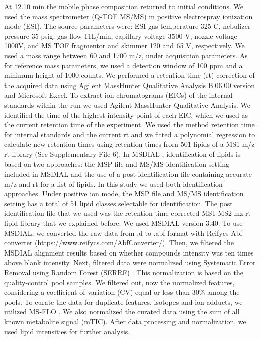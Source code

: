 \documentclass[9pt,twocolumn,twoside,lineno]{BioRxiv}
\begin{document}
At 12.10 min the mobile phase composition returned to initial conditions.
We used the mass spectrometer (Q-TOF MS/MS) in positive electrospray ionization mode (ESI).
The source parameters were: ESI gas temperature 325 \degree C, nebulizer pressure 35 psig, gas flow 11L/min, capillary voltage 3500 V, nozzle voltage 1000V, and MS TOF fragmentor and skimmer 120 and 65 V, respectively.
We used a mass range between 60 and 1700 m/z, under acquisition parameters. 
As for reference mass parameters, we used a detection window of 100 ppm and a minimum height of 1000 counts. 
We performed a retention time (rt) correction of the acquired data using Agilent MassHunter Qualitative Analysis B.06.00 version and Microsoft Excel. 
To extract ion chromatograms (EICs) of the internal standards within the run we used Agilent MassHunter Qualitative Analysis.
We identified the time of the highest intensity point of each EIC, which we used as the current retention time of the experiment. 
We used the method retention time for internal standards and the current rt and we fitted a polynomial regression to calculate new retention times using retention times from 501 lipids of a MS1 m/z-rt library (See Supplementary File 6). 
In MSDIAL \cite{Tsugawa2015-kh}, identification of lipids is based on two approaches: the MSP file and MS/MS identification setting included in MSDIAL and the use of a post identification file containing accurate m/z and rt for a list of lipids. 
In this study we used both identification approaches. 
Under positive ion mode, the MSP file and MS/MS identification setting has a total of 51 lipid classes  selectable for identification. 
The post identification file that we used was the retention time-corrected MS1-MS2 mz-rt lipid library that we explained before. 
We used MSDIAL \cite{Tsugawa2015-kh} version 3.40. 
To use MSDIAL, we converted the raw data from .d to .abf format with Reifycs Abf converter (https://www.reifycs.com/AbfConverter/). 
Then, we filtered the MSDIAL alignment results based on whether compounds intensity was ten times above blank intensity. Next, filtered data were normalized using Systematic Error Removal using Random Forest (SERRF) \cite{Fan2019}. This normalization is based on the quality-control pool samples. 
We filtered out, now the normalized features, considering a coefficient of variation (CV) equal or less than 30\% among the pools. 
To curate the data for duplicate features, isotopes and ion-adducts, we utilized MS-FLO \cite{DeFelice2017-ms}.
We also normalized the curated data using the sum of all known metabolite signal (mTIC). 
After data processing and normalization, we used lipid intensities for further analysis.
\end{document}
